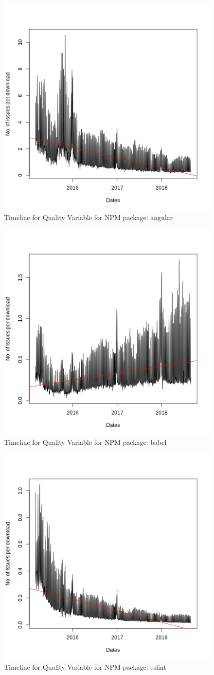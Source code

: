 \documentclass[smallextended]{svjour3}       %
\begin{document}
\begin{figure}[!t]
\centering
\includegraphics[width=0.5\linewidth]{angular}
\caption{Timeline for Quality Variable for NPM package: angular}
\label{fig:tNa}
\end{figure}

\begin{figure}[!t]
\centering
\includegraphics[width=0.5\linewidth]{babel}
\caption{Timeline for Quality Variable for NPM package: babel}
\label{fig:tNb}
\end{figure}

\begin{figure}[!t]
\centering
\includegraphics[width=0.5\linewidth]{eslint}
\caption{Timeline for Quality Variable for NPM package: eslint}
\label{fig:tNe}
\end{figure}
\end{document}
